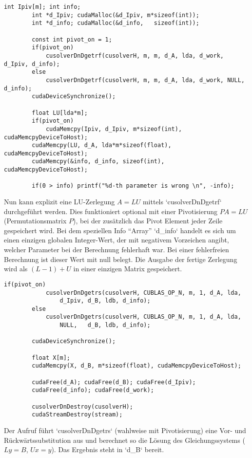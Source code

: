 		\begin{lstlisting}[caption=cuSOLVER: LU-Zerlegung]
		int Ipiv[m]; int info; 
		int *d_Ipiv; cudaMalloc(&d_Ipiv, m*sizeof(int));
		int *d_info; cudaMalloc(&d_info,   sizeof(int));
		
		const int pivot_on = 1;
		if(pivot_on) 
			cusolverDnDgetrf(cusolverH, m, m, d_A, lda, d_work, d_Ipiv, d_info);
		else          
			cusolverDnDgetrf(cusolverH, m, m, d_A, lda, d_work, NULL,   d_info);
		cudaDeviceSynchronize();

		float LU[lda*m];
		if(pivot_on) 
			cudaMemcpy(Ipiv, d_Ipiv, m*sizeof(int), cudaMemcpyDeviceToHost);
		cudaMemcpy(LU, d_A, lda*m*sizeof(float), cudaMemcpyDeviceToHost);
		cudaMemcpy(&info, d_info, sizeof(int), cudaMemcpyDeviceToHost);

		if(0 > info) printf("%d-th parameter is wrong \n", -info);
		\end{lstlisting}
		
		Nun kann explizit eine LU-Zerlegung $A = LU$ mittels \li`cusolverDnDgetrf` durchgeführt werden. Dies funktioniert optional mit einer Pivotisierung $PA = LU$ (Permutationsmatrix $P$), bei der zusätzlich das Pivot Element jeder Zeile gespeichert wird. Bei dem speziellen Info \enquote{Array} \li`d_info` handelt es sich um einen einzigen globalen Integer-Wert, der mit negativem Vorzeichen angibt, welcher Parameter bei der Berechnung fehlerhaft war. Bei einer fehlerfreien Berechnung ist dieser Wert mit null belegt. Die Ausgabe der fertige Zerlegung wird als $(L-1)+U$ in einer einzigen Matrix gespeichert.
		
		\begin{lstlisting}[caption=cuSOLVER: Gleichungssystem lösen]
		if(pivot_on) 
			cusolverDnDgetrs(cusolverH, CUBLAS_OP_N, m, 1, d_A, lda, 
			    d_Ipiv, d_B, ldb, d_info);
		else         
			cusolverDnDgetrs(cusolverH, CUBLAS_OP_N, m, 1, d_A, lda, 
			    NULL,   d_B, ldb, d_info);
			
		cudaDeviceSynchronize();

		float X[m];
		cudaMemcpy(X, d_B, m*sizeof(float), cudaMemcpyDeviceToHost);

		cudaFree(d_A); cudaFree(d_B); cudaFree(d_Ipiv);
		cudaFree(d_info); cudaFree(d_work);

		cusolverDnDestroy(cusolverH);
		cudaStreamDestroy(stream);
		\end{lstlisting}
		
		Der Aufruf führt \li`cusolverDnDgetrs` (wahlweise mit Pivotisierung) eine Vor- und Rückwärtssubstitution aus und berechnet so die Lösung des Gleichungssystems ($Ly = B$, $Ux = y$). Das Ergebnis steht in \li`d_B` bereit.
		
